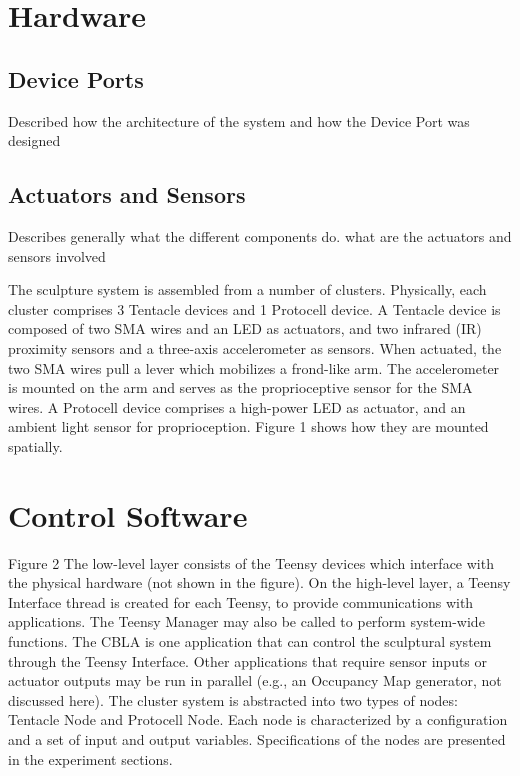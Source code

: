 \section{Hardware} \label{section:hardware}


\subsection{Device Ports}
Described how the architecture of the system and how the Device Port was designed

\subsection{Actuators and Sensors}
Describes generally what the different components do. what are the actuators and sensors involved



The sculpture system is assembled from a number of clusters. Physically, each cluster comprises 3 Tentacle devices and 1 Protocell device. A Tentacle device is composed of two SMA wires and an LED as actuators, and two infrared (IR) proximity sensors and a three-axis accelerometer as sensors. When actuated, the two SMA wires pull a lever which mobilizes a frond-like arm. The accelerometer is mounted on the arm and serves as the proprioceptive sensor for the SMA wires. A Protocell device comprises a high-power LED as actuator, and an ambient light sensor for proprioception. Figure 1 shows how they are mounted spatially.


\section{Control Software}

Figure 2	 The low-level layer consists of the Teensy devices which interface with the physical hardware (not shown in the figure). On the high-level layer, a Teensy Interface thread is created for each Teensy, to provide communications with applications. The Teensy Manager may also be called to perform system-wide functions. The CBLA is one application that can control the sculptural system through the Teensy Interface. Other applications that require sensor inputs or actuator outputs may be run in parallel (e.g., an Occupancy Map generator, not discussed here).
The cluster system is abstracted into two types of nodes: Tentacle Node and Protocell Node. Each node is characterized by a configuration and a set of input and output variables. Specifications of the nodes are presented in the experiment sections.

